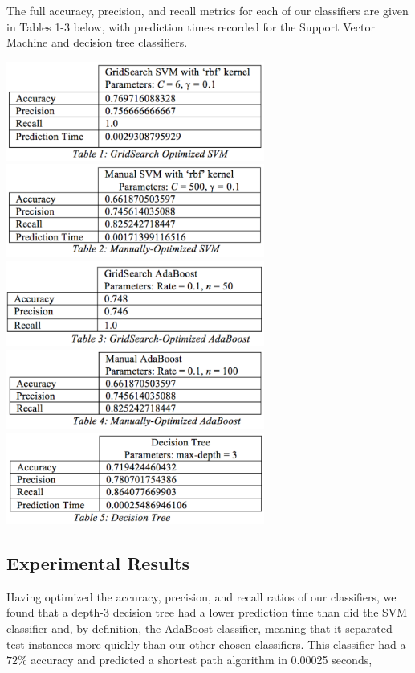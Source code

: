 \documentclass{article}
\begin{document}
The full accuracy, precision, and recall metrics for each of our classifiers are given in Tables 1-3 below, with prediction times recorded for the Support Vector Machine and decision tree classifiers.

\includegraphics[width=8.5cm]{table1}
\includegraphics[width=8.5cm]{table2}
\includegraphics[width=8.5cm]{table3}
\includegraphics[width=8.5cm]{table4}
\includegraphics[width=8.5cm]{table5}

\subsection{Experimental Results}

Having optimized the accuracy, precision, and recall ratios of our classifiers, we found that a depth-3 decision tree had a lower prediction time than did the SVM classifier and, by definition, the AdaBoost classifier, meaning that it separated test instances more quickly than our other chosen classifiers. This classifier had a $72\%$ accuracy and predicted a shortest path algorithm in 0.00025 seconds,
\end{document}

